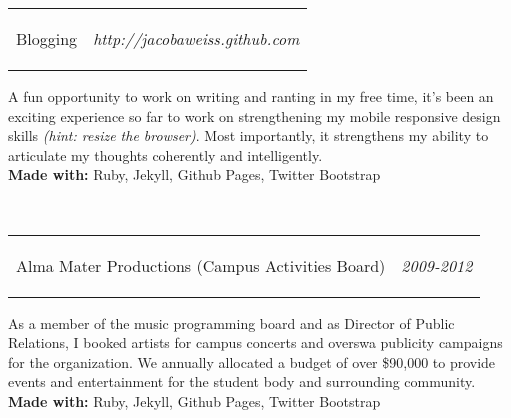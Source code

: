 \documentclass[11pt]{article}
\makeatletter
\newcommand{\headerrow}[2]
{\begin{tabular*}{\linewidth}{l@{\extracolsep{\fill}}r}
	#1 &
	#2 \\
\end{tabular*}}
\makeatother
\begin{document}
\headerrow
	{\begin{Large}Blogging\end{Large}}
	{\textit{http://jacobaweiss.github.com}}
	\begin{normalsize}
	\hspace*{1.5em}A fun opportunity to work on writing and ranting in my free time, it's been an exciting experience so far to work on strengthening my mobile responsive design skills {\textit{(hint: resize the browser)}}. Most importantly, it strengthens my ability to articulate my thoughts coherently and intelligently.\\
	{\bf Made with:} Ruby, Jekyll, Github Pages, Twitter Bootstrap
	\end{normalsize} \\
	
	\headerrow
	{\begin{Large}Alma Mater Productions (Campus Activities Board)\end{Large}}
	{\textit{2009-2012}}
	\begin{normalsize}
	\hspace*{1.5em}As a member of the music programming board and as Director of Public Relations, I booked artists for campus concerts and overswa publicity campaigns for the organization. We annually allocated a budget of over \$90,000 to provide events and entertainment for the student body and surrounding community. \\
	{\bf Made with:} Ruby, Jekyll, Github Pages, Twitter Bootstrap
	\end{normalsize}
\end{document}
